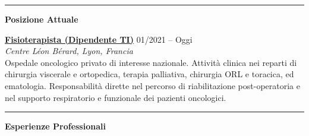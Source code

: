 \documentclass[a4paper]{article}
\newcommand{\block}[1]{\hrule \vspace{0.2cm} \textbf{\Large #1} \vspace{0.2cm}}
\newcommand{\voice}[5]{\href{#4}{\textbf{#1}} \hfill #2 \\ \textit{#3} \\ {\small #5} \vspace{0.2cm} \\}
\begin{document}
\begin{minipage}[t]{0.6\columnwidth}

	\block{Posizione Attuale}

    \voice{Fisioterapista (Dipendente TI)}
    {01/2021 -- Oggi}
    {Centre Léon Bérard, Lyon, Francia}
    {https://www.centreleonberard.fr/en}
    {
        Ospedale oncologico privato di interesse nazionale.
    Attività clinica nei reparti di chirurgia viscerale e ortopedica, terapia palliativa, chirurgia ORL e toracica, ed ematologia.
    Responsabilità dirette nel percorso di riabilitazione post-operatoria e nel supporto respiratorio e funzionale dei pazienti oncologici.%
    }

    \block{Esperienze Professionali}


\end{minipage}
\end{document}
